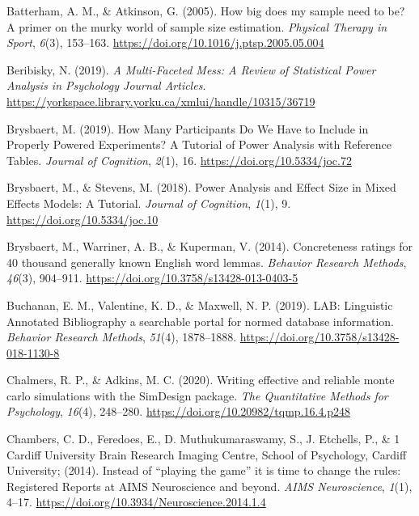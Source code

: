 \documentclass[
  man]{apa7}
\newlength{\cslhangindent}
\newlength{\cslentryspacingunit} %
\newenvironment{CSLReferences}[2] %
 {%
  \setlength{\parindent}{0pt}
  \ifodd #1
  \let\oldpar\par
  \def\par{\hangindent=\cslhangindent\oldpar}
  \fi
  \setlength{\parskip}{#2\cslentryspacingunit}
 }%
 {}
\begin{document}
\begin{CSLReferences}{1}{0}
\leavevmode{}%
Batterham, A. M., \& Atkinson, G. (2005). How big does my sample need to be? A primer on the murky world of sample size estimation. \emph{Physical Therapy in Sport}, \emph{6}(3), 153--163. \url{https://doi.org/10.1016/j.ptsp.2005.05.004}

\leavevmode{}%
Beribisky, N. (2019). \emph{A Multi-Faceted Mess: A Review of Statistical Power Analysis in Psychology Journal Articles}. \url{https://yorkspace.library.yorku.ca/xmlui/handle/10315/36719}

\leavevmode{}%
Brysbaert, M. (2019). How Many Participants Do We Have to Include in Properly Powered Experiments? A Tutorial of Power Analysis with Reference Tables. \emph{Journal of Cognition}, \emph{2}(1), 16. \url{https://doi.org/10.5334/joc.72}

\leavevmode{}%
Brysbaert, M., \& Stevens, M. (2018). Power Analysis and Effect Size in Mixed Effects Models: A Tutorial. \emph{Journal of Cognition}, \emph{1}(1), 9. \url{https://doi.org/10.5334/joc.10}

\leavevmode{}%
Brysbaert, M., Warriner, A. B., \& Kuperman, V. (2014). Concreteness ratings for 40 thousand generally known English word lemmas. \emph{Behavior Research Methods}, \emph{46}(3), 904--911. \url{https://doi.org/10.3758/s13428-013-0403-5}

\leavevmode{}%
Buchanan, E. M., Valentine, K. D., \& Maxwell, N. P. (2019). LAB: Linguistic Annotated Bibliography {\textendash} a searchable portal for normed database information. \emph{Behavior Research Methods}, \emph{51}(4), 1878--1888. \url{https://doi.org/10.3758/s13428-018-1130-8}

\leavevmode{}%
Chalmers, R. P., \& Adkins, M. C. (2020). Writing effective and reliable monte carlo simulations with the SimDesign package. \emph{The Quantitative Methods for Psychology}, \emph{16}(4), 248--280. \url{https://doi.org/10.20982/tqmp.16.4.p248}

\leavevmode{}%
Chambers, C. D., Feredoes, E., D. Muthukumaraswamy, S., J. Etchells, P., \& 1 Cardiff University Brain Research Imaging Centre, School of Psychology, Cardiff University; (2014). Instead of {``}playing the game{''} it is time to change the rules: Registered Reports at AIMS Neuroscience and beyond. \emph{AIMS Neuroscience}, \emph{1}(1), 4--17. \url{https://doi.org/10.3934/Neuroscience.2014.1.4}


\end{CSLReferences}
\end{document}
